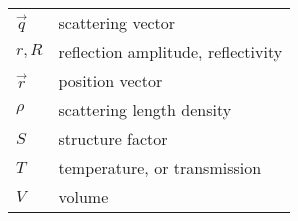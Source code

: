 \documentclass[\main/dresen_thesis.tex]{subfiles}
\begin{document}
\begin{table}[H]
\begin{tabular}{p{3cm}l}
        $\vec{q}$                   & scattering vector\\
        $r, R$                      & reflection amplitude, reflectivity\\
        $\vec{r}$                   & position vector\\
        $\rho$                      & scattering length density\\
        $S$                         & structure factor\\
        $T$                         & temperature, or transmission\\
        $V$                         & volume\\
			\end{tabular}
  \end{table}
\end{document}
